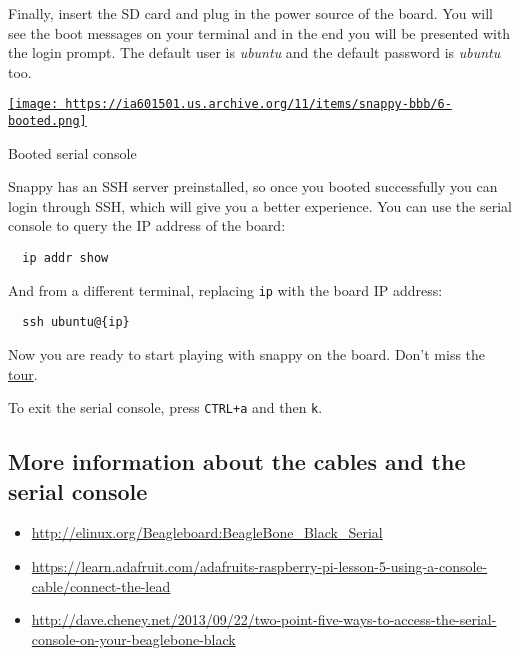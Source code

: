 \documentclass[12pt]{article}
\begin{document}
Finally, insert the SD card and plug in the power source of the board. You
will see the boot messages on your terminal and in the end you will be
presented with the login prompt. The default user is \emph{ubuntu} and the
default password is \emph{ubuntu} too.

\begin{center}
  \href{
    https://ia601501.us.archive.org/11/items/snappy-bbb/6-booted.png}{
    \texttt{[image: 
      https://ia601501.us.archive.org/11/items/snappy-bbb/6-booted.png]}
  }
  \caption{Booted serial console}
\end{center}

Snappy has an SSH server preinstalled, so once you booted successfully you can login through SSH, which will give you a better experience. You can use the serial console to query the IP address of the board:

\begin{verbatim}
  ip addr show
\end{verbatim}

And from a different terminal, replacing \verb$ip$ with the board IP address:

\begin{verbatim}
  ssh ubuntu@{ip}
\end{verbatim}

Now you are ready to start playing with snappy on the board. Don't miss the
\href{https://developer.ubuntu.com/en/snappy/tutorials/using-snappy/}{tour}.

To exit the serial console, press \verb$CTRL+a$ and then \verb$k$.

\subsection{More information about the cables and the serial console}

\begin{itemize}
  \item \url{http://elinux.org/Beagleboard:BeagleBone_Black_Serial}
  \item \url{https://learn.adafruit.com/adafruits-raspberry-pi-lesson-5-using-a-console-cable/connect-the-lead}
  \item \url{http://dave.cheney.net/2013/09/22/two-point-five-ways-to-access-the-serial-console-on-your-beaglebone-black}
\end{itemize}
\end{document}
